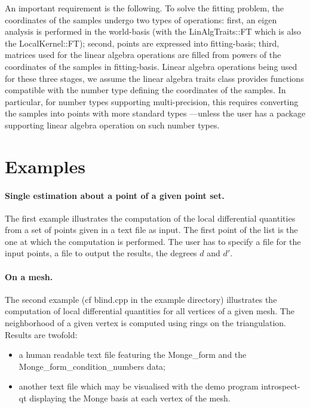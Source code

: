 An important requirement is the following. To solve the fitting
problem, the coordinates of the samples undergo two types of
operations: first, an eigen analysis is performed in the world-basis
(with the LinAlgTraits::FT which is also the LocalKernel::FT); second,
points are expressed into fitting-basis; third, matrices used for the
linear algebra operations are filled from powers of the coordinates of
the samples in fitting-basis. Linear algebra operations being used for
these three stages, we assume the linear algebra traits class provides
functions compatible with the number type defining the coordinates of
the samples. In particular, for number types supporting
multi-precision, this requires converting the samples into points with
more standard types ---unless the user has a package supporting linear
algebra operation on such number types.





\section{Examples} 

\paragraph{Single estimation about a point of a given point set.}
The first example illustrates the computation of the local
differential quantities from a set of points given in a text file as
input. The first point of the list is the one at which the computation
is performed. The user has to specify a file for the input points, a
file to output the results, the degrees $d$ and $d'$.

\paragraph{On a mesh.}
The second example (cf blind.cpp in the example directory) illustrates
the computation of local differential quantities for all vertices of a
given mesh. The neighborhood of a given vertex is computed using rings on
the triangulation. Results are twofold:
\begin{itemize}
\item
a human readable text file featuring the Monge\_form and the
Monge\_form\_condition\_numbers data;
\item
another text file which may be visualised with the demo program
introspect-qt displaying the Monge basis at each vertex of the mesh.
\end{itemize}

